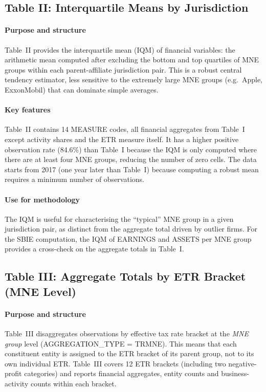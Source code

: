 \documentclass[11pt,a4paper]{article}
\begin{document}
\subsection{Table II: Interquartile Means by Jurisdiction}\label{sec:table2}

\paragraph{Purpose and structure}
Table~II provides the interquartile mean (IQM) of financial variables: the arithmetic mean computed after excluding the bottom and top quartiles of MNE groups within each parent-affiliate jurisdiction pair. This is a robust central tendency estimator, less sensitive to the extremely large MNE groups (e.g.\ Apple, ExxonMobil) that can dominate simple averages.

\paragraph{Key features}
Table~II contains 14 MEASURE codes, all financial aggregates from Table~I except activity shares and the ETR measure itself. It has a higher positive observation rate (84.6\%) than Table~I because the IQM is only computed where there are at least four MNE groups, reducing the number of zero cells. The data starts from 2017 (one year later than Table~I) because computing a robust mean requires a minimum number of observations.

\paragraph{Use for methodology}
The IQM is useful for characterising the ``typical'' MNE group in a given jurisdiction pair, as distinct from the aggregate total driven by outlier firms. For the SBIE computation, the IQM of EARNINGS and ASSETS per MNE group provides a cross-check on the aggregate totals in Table~I. 

\subsection{Table III: Aggregate Totals by ETR Bracket (MNE Level)}\label{sec:table3}

\paragraph{Purpose and structure}
Table~III disaggregates observations by effective tax rate bracket at the \emph{MNE group} level (AGGREGATION\_TYPE = TRMNE). This means that each constituent entity is assigned to the ETR bracket of its parent group, not to its own individual ETR. Table~III covers 12 ETR brackets (including two negative-profit categories) and reports financial aggregates, entity counts and business-activity counts within each bracket.
\end{document}
